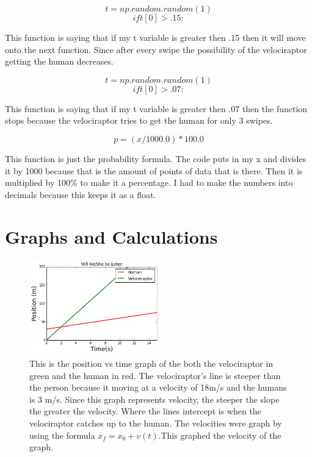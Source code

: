 \documentclass[twocolumn]{revtex4}
\begin{document}
$$ t = np.random.random(1)$$
$$if t[0]>.15:$$

This function is saying that if my t variable is greater then .15 then it will move onto the next function. Since after every swipe the possibility of the velociraptor getting the human decreases. 

$$ t = np.random.random(1)$$
$$if t[0]>.07:$$

This function is saying that if my t variable is greater then .07 then the function stops because the velociraptor tries to get the human for only 3 swipes. 

$$p = (x/1000.0) * 100.0$$

This function is just the probability formula. The code puts in my x and divides it by 1000 because that is the amount of points of data that is there. Then it is multiplied by 100\% to make it a percentage. I had to make the numbers into decimals because this keeps it as a float. 

\section{Graphs and Calculations} 

\begin{figure}[h]
	\includegraphics[width = 0.5\textwidth] {original_intersection.png}
	\caption{This is the position vs time graph of the both the velociraptor in green and the human in red. The velociraptor's line is steeper than the person because it moving at a velocity of 18m/s and the humans is 3 m/s. Since this graph represents velocity, the steeper the slope the greater the velocity. Where the lines intercept is when the velociraptor catches up to the human. The velocities were graph by using the formula $x_f= x_0 + v(t)$.This graphed the velocity of the graph. \label{fig:Graph when Velociraptor catches up to Person}}
\end{figure}
\end{document}

